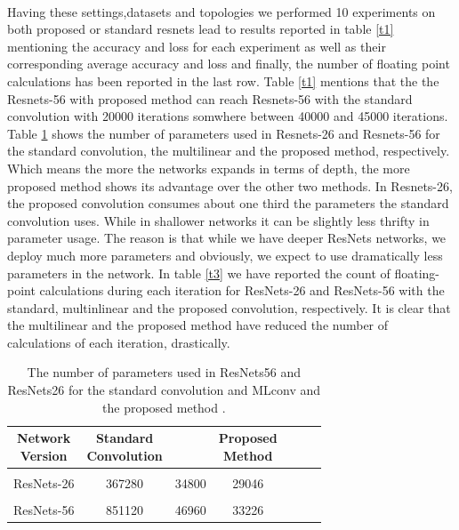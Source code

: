 \documentclass{report}
\begin{document}
\paragraph*{}
Having these settings,datasets and topologies we performed 10 experiments on both proposed or standard resnets lead to results reported in table 
\ref{t1}
 mentioning the accuracy and loss for each experiment as well as their corresponding average accuracy and loss and finally, the number of floating point calculations has been reported in the last row. Table \ref{t1} mentions that the the Resnets-56 with proposed method can reach Resnets-56 with the standard convolution with 20000 iterations somwhere between 40000 and 45000 iterations. Table 
 \ref{t2}
  shows the number of parameters used in Resnets-26 and Resnets-56 for the standard convolution, the multilinear and the proposed method, respectively. Which means the more the networks expands in terms of depth, the more proposed method shows its advantage over the other two methods. In Resnets-26, the proposed convolution consumes about one third the parameters the standard convolution uses. While in shallower networks it can be slightly less thrifty in parameter usage. The reason is that while we have deeper ResNets networks, we deploy much more parameters and obviously, we expect to use dramatically less parameters in the network. In table 
\ref{t3}
 we have reported the count of floating-point calculations during each iteration for ResNets-26 and ResNets-56 with the standard, multinlinear and the proposed convolution, respectively. It is clear that the multilinear and the proposed method have reduced the number of calculations of each iteration, drastically.





\begin{table} 
	\begin{center}
		\caption{
The number of parameters used in 
			ResNets56
			and 
			ResNets26
			for the standard convolution and 
			MLconv 
			and the proposed method
			.
		}
		\label{t2}
		\begin{tabular}{c|c|c|c|c|c|c}
			\thead{
				Network\\ Version }&  
			\thead {
				Standard\\
				Convolution}
			&
			\thead {
				MLconv}
			&
			\thead {Proposed \\Method}
			
			\\
			\hline 	&&&	\\
ResNets-26 &  367280  &  34800 &  29046\\ &&&\\
			ResNets-56 & 851120 &    46960 & 33226
			
			
		\end{tabular}
		
	\end{center}
\end{table}
\end{document}
